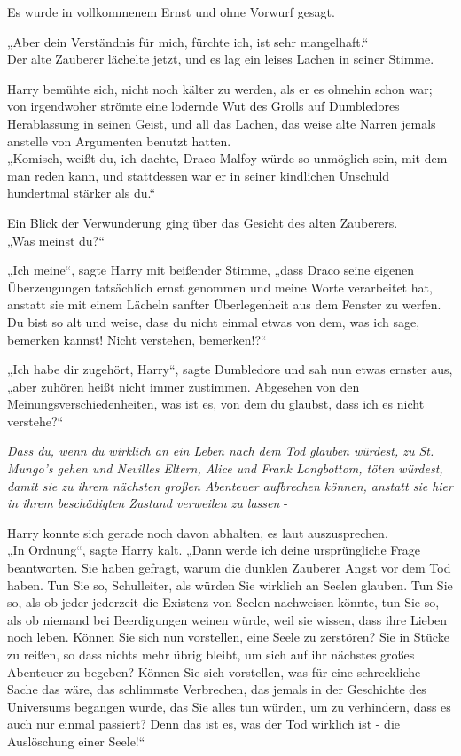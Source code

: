 {Es wurde in vollkommenem Ernst und ohne Vorwurf gesagt.

„Aber dein Verständnis für mich, fürchte ich, ist sehr mangelhaft.“\\ Der alte Zauberer lächelte jetzt, und es lag ein leises Lachen in seiner Stimme.

Harry bemühte sich, nicht noch kälter zu werden, als er es ohnehin schon war; von irgendwoher strömte eine lodernde Wut des Grolls auf Dumbledores Herablassung in seinen Geist, und all das Lachen, das weise alte Narren jemals anstelle von Argumenten benutzt hatten.\\ „Komisch, weißt du, ich dachte, Draco Malfoy würde so unmöglich sein, mit dem man reden kann, und stattdessen war er in seiner kindlichen Unschuld hundertmal stärker als du.“

Ein Blick der Verwunderung ging über das Gesicht des alten Zauberers.\\ „Was meinst du?“

„Ich meine“, sagte Harry mit beißender Stimme, „dass Draco seine eigenen Überzeugungen tatsächlich ernst genommen und meine Worte verarbeitet hat, anstatt sie mit einem Lächeln sanfter Überlegenheit aus dem Fenster zu werfen. Du bist so alt und weise, dass du nicht einmal etwas von dem, was ich sage, bemerken kannst! Nicht verstehen, bemerken!?“

„Ich habe dir zugehört, Harry“, sagte Dumbledore und sah nun etwas ernster aus, „aber zuhören heißt nicht immer zustimmen. Abgesehen von den Meinungsverschiedenheiten, was ist es, von dem du glaubst, dass ich es nicht verstehe?“

\emph{Dass du, wenn du wirklich an ein Leben nach dem Tod glauben würdest, zu St. Mungo's gehen und Nevilles Eltern, Alice und Frank Longbottom, töten würdest, damit sie zu ihrem nächsten großen Abenteuer aufbrechen können, anstatt sie hier in ihrem beschädigten Zustand verweilen zu lassen} -

Harry konnte sich gerade noch davon abhalten, es laut auszusprechen.\\ „In Ordnung“, sagte Harry kalt. „Dann werde ich deine ursprüngliche Frage beantworten. Sie haben gefragt, warum die dunklen Zauberer Angst vor dem Tod haben. Tun Sie so, Schulleiter, als würden Sie wirklich an Seelen glauben. Tun Sie so, als ob jeder jederzeit die Existenz von Seelen nachweisen könnte, tun Sie so, als ob niemand bei Beerdigungen weinen würde, weil sie wissen, dass ihre Lieben noch leben. Können Sie sich nun vorstellen, eine Seele zu zerstören? Sie in Stücke zu reißen, so dass nichts mehr übrig bleibt, um sich auf ihr nächstes großes Abenteuer zu begeben? Können Sie sich vorstellen, was für eine schreckliche Sache das wäre, das schlimmste Verbrechen, das jemals in der Geschichte des Universums begangen wurde, das Sie alles tun würden, um zu verhindern, dass es auch nur einmal passiert? Denn das ist es, was der Tod wirklich ist - die Auslöschung einer Seele!“

}
